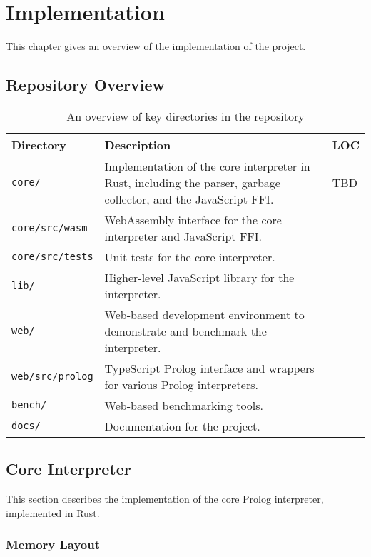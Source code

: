 \chapter{Implementation}

This chapter gives an overview of the implementation of the project.


\section{Repository Overview}

\begin{table}[H]
\centering
\begin{tabular}{lp{11cm}l}
\hline
\textbf{Directory} & \textbf{Description} & \textbf{LOC} \\
\hline
\texttt{core/} & Implementation of the core interpreter in Rust, including the parser, garbage collector, and the JavaScript FFI. & TBD \\
\texttt{core/src/wasm} & WebAssembly interface for the core interpreter and JavaScript FFI. & \\
\texttt{core/src/tests} & Unit tests for the core interpreter. & \\
\texttt{lib/} & Higher-level JavaScript library for the interpreter. & \\
\texttt{web/} & Web-based development environment to demonstrate and benchmark the interpreter. & \\
\texttt{web/src/prolog} & TypeScript Prolog interface and wrappers for various Prolog interpreters. & \\
\texttt{bench/} & Web-based benchmarking tools. & \\
\texttt{docs/} & Documentation for the project. & \\
\hline
\end{tabular}
\caption{An overview of key directories in the repository}
\label{tab:repository-overview}
\end{table}

\section{Core Interpreter}

This section describes the implementation of the core Prolog interpreter, implemented in Rust.

\subsection{Memory Layout}

